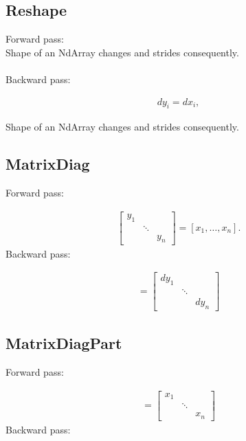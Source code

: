 \documentclass{article}
\begin{document}
\subsection{Reshape}

Forward pass:\\

Shape of an NdArray changes and strides consequently. \\ \\
%
Backward pass:

\begin{eqnarray}
  dy_i = dx_i, 
\end{eqnarray}

Shape of an NdArray changes and strides consequently. 


\subsection{MatrixDiag}

Forward pass:

\begin{eqnarray}
  \begin{bmatrix}
    y_1 & & \\
    & \ddots & \\
    & & y_n 
  \end{bmatrix}
  = [x_1, \ldots, x_n].
\end{eqnarray}
%
Backward pass:

\begin{eqnarray}
  [dx_1, \ldots, dx_n] = 
  \begin{bmatrix}
    dy_1 & & \\
    & \ddots & \\
    & & dy_n 
  \end{bmatrix} 
\end{eqnarray}


\subsection{MatrixDiagPart}

Forward pass:

\begin{eqnarray}
  [y_1, \ldots, y_n] = 
  \begin{bmatrix}
    x_1 & & \\
    & \ddots & \\
    & & x_n 
  \end{bmatrix}
\end{eqnarray}
%
Backward pass:
\end{document}
